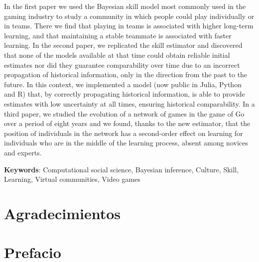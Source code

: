\documentclass[a4paper,11pt]{book}
\makeatletter
\renewcommand{\mainmatter}{\cleardoublepage\@mainmattertrue}
\theoremstyle{definition}
\makeatother
\begin{document}

In the first paper we used the Bayesian skill model most commonly used in the gaming industry to study a community in which people could play individually or in teams.
There we find that playing in teams is associated with higher long-term learning, and that maintaining a stable teammate is associated with faster learning.
In the second paper, we replicated the skill estimator and discovered that none of the models available at that time could obtain reliable initial estimates nor did they guarantee comparability over time due to an incorrect propagation of historical information, only in the direction from the past to the future.
In this context, we implemented a model (now public in Julia, Python and R) that, by correctly propagating historical information, is able to provide estimates with low uncertainty at all times, ensuring historical comparability.
In a third paper, we studied the evolution of a network of games in the game of Go over a period of eight years and we found, thanks to the new estimator, that the position of individuals in the network has a second-order effect on learning for individuals who are in the middle of the learning process, absent among novices and experts.
%
\vspace{0.1cm}

\noindent \textbf{Keywords}: Computational social science, Bayesian inference, Culture, Skill, Learning, Virtual communities, Video games

\normalsize

\tableofcontents

\newpage

\vfill


\normalsize

\chapter{Agradecimientos}


\mainmatter

\chapter*{Prefacio}
\end{document}
